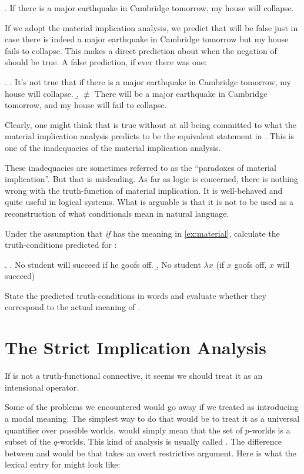 \ex. \label{earthquake}If there is a major earthquake in Cambridge tomorrow, my house will collapse.

If we adopt the material implication analysis, we predict that \Last will be false just in case there is indeed a major earthquake in Cambridge tomorrow but my house fails to collapse. This makes a direct prediction about when the negation of \Last should be true. A false prediction, if ever there was one:

\ex. \a. \label{neg-earthquake}It's not true that if there is a major earthquake in Cambridge tomorrow, my house will collapse. 
\b. $\not\equiv$ There will be a major earthquake in Cambridge tomorrow, and my house will fail to collapse.

Clearly, one might think that \Last[a] is true without at all being committed to what the material implication analysis predicts to be the equivalent statement in \Last[b]. This is one of the inadequacies of the material implication analysis.

These inadequacies are sometimes referred to as the ``paradoxes of material implication''. But that is misleading. As far as logic is concerned, there is nothing wrong with the truth-function of material implication. It is well-behaved and quite useful in logical systems. What is arguable is that it is not to be used as a reconstruction of what conditionals mean in natural language.

\begin{exercise}
  Under the assumption that \emph{if} has the meaning in \ref{ex:material}, calculate the truth-conditions predicted for \Next:

\ex. \a. No student will succeed if he goofs off.
\b. No student $\lambda x$ (if $x$ goofs off, $x$ will succeed)

State the predicted truth-conditions in words and evaluate whether they correspond to the actual meaning of \Last.
\eex
\end{exercise}

\section{The Strict Implication Analysis}

If  is not a truth-functional connective, it seems we should
treat it as an intensional operator. 

Some of the problems we encountered would go away if we treated  as introducing a modal meaning. The simplest way to do that would be to treat it as a universal quantifier over possible worlds.  would simply mean that the set of $p$-worlds is a subset of the $q$-worlds. This kind of analysis is usually called . The difference between  and  would be that  takes an overt restrictive argument. Here is what the lexical entry for  might look like:

